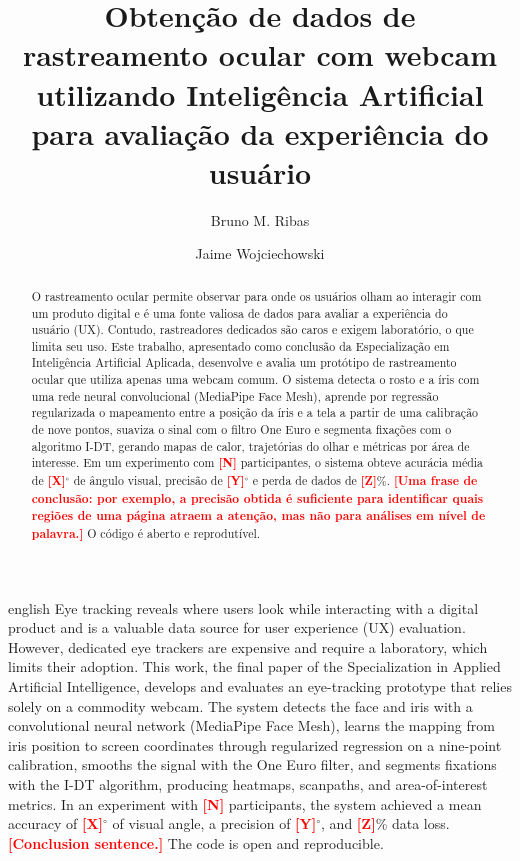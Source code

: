 \documentclass[sigconf, nonacm, language=english, language=portuguese, natbib=false]{acmart}
\newcommand{\pendente}[1]{\textcolor{red}{\textbf{[#1]}}}
\begin{document}
\title{Obtenção de dados de rastreamento ocular com webcam utilizando Inteligência Artificial para avaliação da experiência do usuário}

\author{Bruno M. Ribas}

\author{Jaime Wojciechowski}

\begin{abstract}
O rastreamento ocular permite observar para onde os usuários olham ao interagir com um produto digital e é uma fonte valiosa de dados para avaliar a experiência do usuário (UX). Contudo, rastreadores dedicados são caros e exigem laboratório, o que limita seu uso. Este trabalho, apresentado como conclusão da Especialização em Inteligência Artificial Aplicada, desenvolve e avalia um protótipo de rastreamento ocular que utiliza apenas uma webcam comum. O sistema detecta o rosto e a íris com uma rede neural convolucional (MediaPipe Face Mesh), aprende por regressão regularizada o mapeamento entre a posição da íris e a tela a partir de uma calibração de nove pontos, suaviza o sinal com o filtro One Euro e segmenta fixações com o algoritmo I-DT, gerando mapas de calor, trajetórias do olhar e métricas por área de interesse. Em um experimento com \pendente{N} participantes, o sistema obteve acurácia média de \pendente{X}$^\circ$ de ângulo visual, precisão de \pendente{Y}$^\circ$ e perda de dados de \pendente{Z}\%. \pendente{Uma frase de conclusão: por exemplo, a precisão obtida é suficiente para identificar quais regiões de uma página atraem a atenção, mas não para análises em nível de palavra.} O código é aberto e reprodutível.
\end{abstract}

\begin{translatedabstract}{english}
Eye tracking reveals where users look while interacting with a digital product and is a valuable data source for user experience (UX) evaluation. However, dedicated eye trackers are expensive and require a laboratory, which limits their adoption. This work, the final paper of the Specialization in Applied Artificial Intelligence, develops and evaluates an eye-tracking prototype that relies solely on a commodity webcam. The system detects the face and iris with a convolutional neural network (MediaPipe Face Mesh), learns the mapping from iris position to screen coordinates through regularized regression on a nine-point calibration, smooths the signal with the One Euro filter, and segments fixations with the I-DT algorithm, producing heatmaps, scanpaths, and area-of-interest metrics. In an experiment with \pendente{N} participants, the system achieved a mean accuracy of \pendente{X}$^\circ$ of visual angle, a precision of \pendente{Y}$^\circ$, and \pendente{Z}\% data loss. \pendente{Conclusion sentence.} The code is open and reproducible.
\end{translatedabstract}
\end{document}
